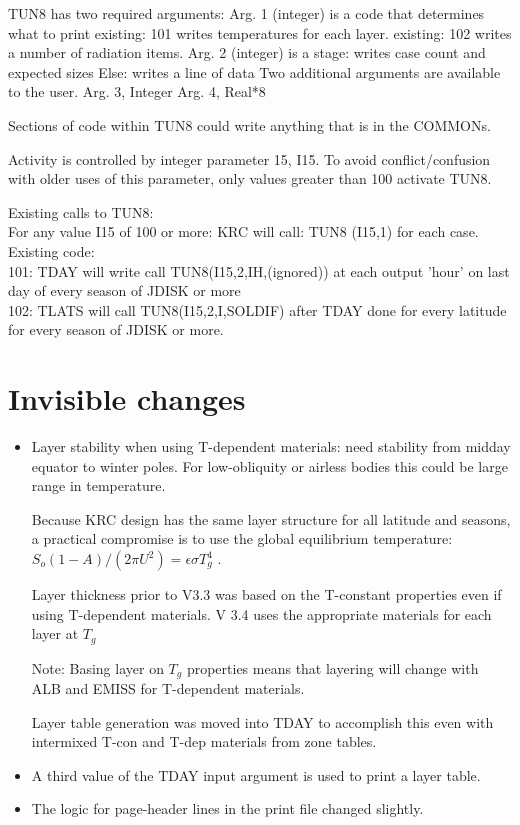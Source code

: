 \documentclass{article}
\begin{document}
TUN8 has two required arguments:
\qi Arg. 1 (integer) is a code that determines what to print  
\qii existing: 101 writes temperatures for each layer.
\qii existing: 102 writes a number of radiation items. 
\qi Arg. 2 (integer) is a stage:
 writes case count and expected sizes 
\qii Else: writes a line of data
\qi Two additional arguments are available to the user.
\qii Arg. 3, Integer
\qii Arg. 4, Real*8

Sections of code within TUN8 could write anything that is in the COMMONs.

Activity is controlled by integer parameter 15, I15. To avoid conflict/confusion 
with older uses of this parameter, only values greater than 100 activate TUN8.

Existing calls to TUN8:
\\ For any value I15 of 100 or more: KRC will call: TUN8 (I15,1) for each case. Existing code:
\\ 101: TDAY will write call TUN8(I15,2,IH,(ignored)) at each output 'hour' on last day of every season of JDISK or more 
\\ 102: TLATS will call TUN8(I15,2,I,SOLDIF) after TDAY done for every latitude for every season of JDISK or more.    

\section{Invisible changes \label{invis}} 
\begin{itemize}      %

 \item Layer stability when using T-dependent materials: need stability from
   midday equator to winter poles. For low-obliquity or airless bodies this
   could be large range in temperature.

Because KRC design has the same layer structure for all latitude and seasons, a
practical compromise is to use the global equilibrium temperature: $ S_o
(1-A)/(2 \pi U^2)= \epsilon \sigma T_g^4$ .

Layer thickness prior to V3.3 was based on the T-constant properties even if
using T-dependent materials.  V 3.4 uses the appropriate materials for each
layer at $T_g$

Note: Basing layer on $T_g$ properties means that layering will change with ALB
and EMISS for T-dependent materials.

Layer table generation was moved into TDAY to accomplish this even with
intermixed T-con and T-dep materials from zone tables.

\item  A third value of the TDAY input argument is used to print a layer table.

\item  The logic for page-header lines in the print file changed slightly.

\end{itemize}
\end{document}
